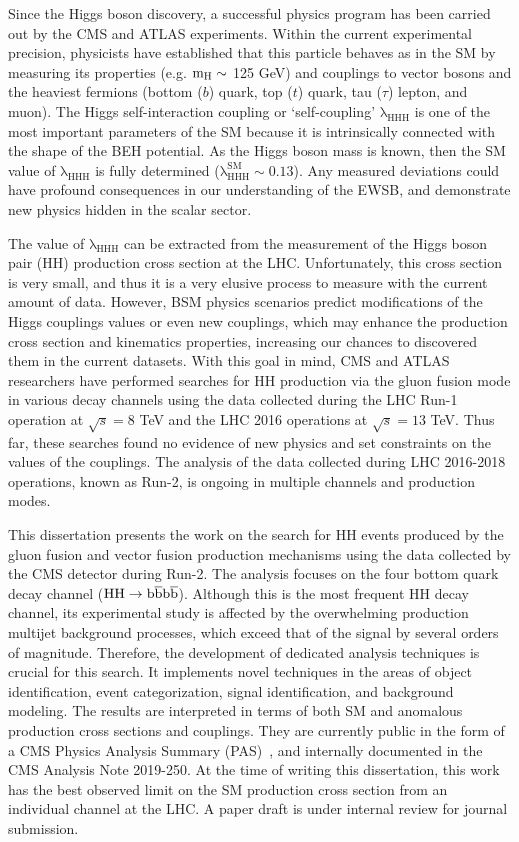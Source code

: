 Since the Higgs boson discovery, a successful physics program has been carried out by the CMS and ATLAS experiments. Within the current experimental precision, physicists have established that this particle behaves as in the SM by measuring its properties (e.g. $\mathrm{m_{H}}\sim$ 125 GeV) and couplings to vector bosons and the heaviest fermions (bottom ($b$) quark, top ($t$) quark, tau ($\tau$) lepton, and muon). The Higgs self-interaction coupling or `self-coupling' $\mathrm{\lambda_{HHH}}$ is one of the most important parameters of the SM because it is intrinsically connected with the shape of the BEH potential. As the Higgs boson mass is known, then the SM value of $\mathrm{\lambda_{HHH}}$ is fully determined ($\mathrm{\lambda^{SM}_{HHH}}\sim0.13$). Any measured deviations could have profound consequences in our understanding of the EWSB, and demonstrate new physics hidden in the scalar sector.

The value of $\mathrm{\lambda_{HHH}}$ can be extracted from the measurement of the Higgs boson pair (HH) production cross section at the LHC. Unfortunately, this cross section is very small, and thus it is a very elusive process to measure with the current amount of data. However, BSM physics scenarios predict modifications of the Higgs couplings values or even new couplings, which may enhance the production cross section and kinematics properties, increasing our chances to discovered them in the current datasets.
With this goal in mind, CMS and ATLAS researchers have performed searches for HH production via the gluon fusion mode in various decay channels using the data collected during the LHC Run-1 operation at $\sqrt{s}=8$ TeV and the LHC 2016 operations at $\sqrt{s}=13$ TeV. Thus far, these searches found no evidence of new physics and set constraints on the values of the couplings. The analysis of the data collected during LHC 2016-2018 operations, known as Run-2, is ongoing in multiple channels and production modes. 

This dissertation presents the work on the search for HH events produced by the gluon fusion and vector fusion production mechanisms using the data collected by the CMS detector during Run-2. The analysis focuses on the four bottom quark decay channel ($\mathrm{HH\rightarrow b\overline{b}b\overline{b} }$). Although this is the most frequent HH decay channel, its experimental study is affected by the overwhelming production multijet background processes, which exceed that of the signal by several orders of magnitude. Therefore, the development of dedicated analysis techniques is crucial for this search. It implements novel techniques in the areas of object identification, event categorization, signal identification, and background modeling. The results are interpreted in terms of both SM and anomalous production cross sections and couplings. They are currently public in the form of a CMS Physics Analysis Summary (PAS)~\cite{thesispas}, and internally documented in the CMS Analysis Note 2019-250. At the time of writing this dissertation, this work has the best observed limit on the SM production cross section from an individual channel at the LHC. A paper draft is under internal review for journal submission. 

